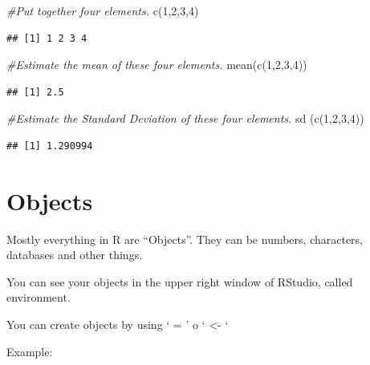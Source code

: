 \documentclass[
]{book}
\newenvironment{Shaded}{\begin{snugshade}}{\end{snugshade}}
\newcommand{\CommentTok}[1]{\textcolor[rgb]{0.56,0.35,0.01}{\textit{#1}}}
\newcommand{\DecValTok}[1]{\textcolor[rgb]{0.00,0.00,0.81}{#1}}
\newcommand{\FunctionTok}[1]{\textcolor[rgb]{0.00,0.00,0.00}{#1}}
\newcommand{\NormalTok}[1]{#1}
\begin{document}
\begin{Shaded}
\begin{Highlighting}[]
\CommentTok{\#Put together four elements.}
\FunctionTok{c}\NormalTok{(}\DecValTok{1}\NormalTok{,}\DecValTok{2}\NormalTok{,}\DecValTok{3}\NormalTok{,}\DecValTok{4}\NormalTok{)}
\end{Highlighting}
\end{Shaded}

\begin{verbatim}
## [1] 1 2 3 4
\end{verbatim}

\begin{Shaded}
\begin{Highlighting}[]
\CommentTok{\#Estimate the mean of these four elements.}
\FunctionTok{mean}\NormalTok{(}\FunctionTok{c}\NormalTok{(}\DecValTok{1}\NormalTok{,}\DecValTok{2}\NormalTok{,}\DecValTok{3}\NormalTok{,}\DecValTok{4}\NormalTok{))}
\end{Highlighting}
\end{Shaded}

\begin{verbatim}
## [1] 2.5
\end{verbatim}

\begin{Shaded}
\begin{Highlighting}[]
\CommentTok{\#Estimate the Standard Deviation of these four elements.}
\FunctionTok{sd}\NormalTok{ (}\FunctionTok{c}\NormalTok{(}\DecValTok{1}\NormalTok{,}\DecValTok{2}\NormalTok{,}\DecValTok{3}\NormalTok{,}\DecValTok{4}\NormalTok{))}
\end{Highlighting}
\end{Shaded}

\begin{verbatim}
## [1] 1.290994
\end{verbatim}

\hypertarget{objects}{%
\section{Objects}\label{objects}}

Mostly everything in R are ``Objects''. They can be numbers, characters, databases and other things.

You can see your objects in the upper right window of RStudio, called environment.

You can create objects by using ` = ' o ` \textless- `

Example:
\end{document}
